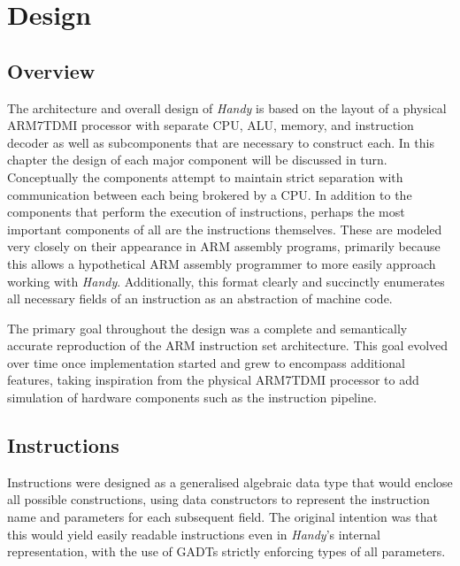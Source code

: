 
\chapter{Design} %

\label{ch:design} %


\section{Overview}

The architecture and overall design of \emph{Handy} is based on the layout of a physical ARM7TDMI processor with separate CPU, ALU, memory, and instruction decoder as well as subcomponents that are necessary to construct each. In this chapter the design of each major component will be discussed in turn. Conceptually the components attempt to maintain strict separation with communication between each being brokered by a CPU. In addition to the components that perform the execution of instructions, perhaps the most important components of all are the instructions themselves. These are modeled very closely on their appearance in ARM assembly programs, primarily because this allows a hypothetical ARM assembly programmer to more easily approach working with \emph{Handy}. Additionally, this format clearly and succinctly enumerates all necessary fields of an instruction as an abstraction of machine code.

The primary goal throughout the design was a complete and semantically accurate reproduction of the ARM instruction set architecture. This goal evolved over time once implementation started and grew to encompass additional features, taking inspiration from the physical ARM7TDMI processor to add simulation of hardware components such as the instruction pipeline.


\section{Instructions}

Instructions were designed as a generalised algebraic data type that would enclose all possible constructions, using data constructors to represent the instruction name and parameters for each subsequent field. The original intention was that this would yield easily readable instructions even in \emph{Handy}'s internal representation, with the use of GADTs strictly enforcing types of all parameters.

